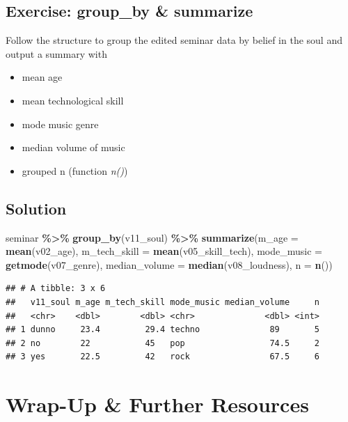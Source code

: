 \documentclass[
]{book}
\newenvironment{Shaded}{\begin{snugshade}}{\end{snugshade}}
\newcommand{\AttributeTok}[1]{\textcolor[rgb]{0.13,0.29,0.53}{#1}}
\newcommand{\FunctionTok}[1]{\textcolor[rgb]{0.13,0.29,0.53}{\textbf{#1}}}
\newcommand{\NormalTok}[1]{#1}
\newcommand{\SpecialCharTok}[1]{\textcolor[rgb]{0.81,0.36,0.00}{\textbf{#1}}}
\providecommand{\tightlist}{%
  \setlength{\itemsep}{0pt}\setlength{\parskip}{0pt}}
\begin{document}
\subsection{Exercise: group\_by \& summarize}\label{exercise-group_by-summarize-1}

Follow the structure to group the edited seminar data by belief in the soul and output a summary with

\begin{itemize}
\tightlist
\item
  mean age
\item
  mean technological skill
\item
  mode music genre
\item
  median volume of music
\item
  grouped n (function \emph{n()})
\end{itemize}

\subsection{Solution}\label{solution-5}

\begin{Shaded}
\begin{Highlighting}[]
\NormalTok{seminar }\SpecialCharTok{\%\textgreater{}\%} 
  \FunctionTok{group\_by}\NormalTok{(v11\_soul) }\SpecialCharTok{\%\textgreater{}\%} 
  \FunctionTok{summarize}\NormalTok{(}\AttributeTok{m\_age =} \FunctionTok{mean}\NormalTok{(v02\_age),}
            \AttributeTok{m\_tech\_skill =} \FunctionTok{mean}\NormalTok{(v05\_skill\_tech),}
            \AttributeTok{mode\_music =} \FunctionTok{getmode}\NormalTok{(v07\_genre),}
            \AttributeTok{median\_volume =} \FunctionTok{median}\NormalTok{(v08\_loudness),}
            \AttributeTok{n =} \FunctionTok{n}\NormalTok{())}
\end{Highlighting}
\end{Shaded}

\begin{verbatim}
## # A tibble: 3 x 6
##   v11_soul m_age m_tech_skill mode_music median_volume     n
##   <chr>    <dbl>        <dbl> <chr>              <dbl> <int>
## 1 dunno     23.4         29.4 techno              89       5
## 2 no        22           45   pop                 74.5     2
## 3 yes       22.5         42   rock                67.5     6
\end{verbatim}

\section{Wrap-Up \& Further Resources}\label{wrap-up-further-resources-3}
\end{document}
